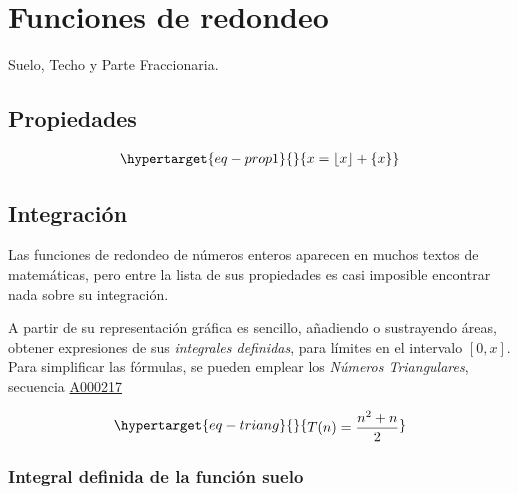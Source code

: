 \documentclass[
  letterpaper,
  DIV=11,
  numbers=noendperiod]{scrreprt}
\begin{document}
\[
\renewcommand{\floor}[1] {\lfloor #1 \rfloor}
\renewcommand{\ceil}[1] {\lceil #1 \rceil}
\renewcommand{\fracpart}[1] {\{ #1 \}}
\]

\hypertarget{funciones-de-redondeo}{%
\section{Funciones de redondeo}\label{funciones-de-redondeo}}

Suelo, Techo y Parte Fraccionaria.

\hypertarget{propiedades}{%
\subsection{Propiedades}\label{propiedades}}

\begin{equation}\protect\hypertarget{eq-prop1}{}{
\begin{align}
x =  \left\lfloor x \right\rfloor + \left\{ x \right\}
\end{align}
}\label{eq-prop1}\end{equation}

\hypertarget{integraciuxf3n}{%
\subsection{Integración}\label{integraciuxf3n}}

Las funciones de redondeo de números enteros aparecen en muchos textos
de matemáticas, pero entre la lista de sus propiedades es casi imposible
encontrar nada sobre su integración.

A partir de su representación gráfica es sencillo, añadiendo o
sustrayendo áreas, obtener expresiones de sus \emph{integrales
definidas}, para límites en el intervalo \([0, x]\). Para simplificar
las fórmulas, se pueden emplear los \emph{Números Triangulares},
secuencia \href{https://oeis.org/A000217}{A000217}

\begin{equation}\protect\hypertarget{eq-triang}{}{
\begin{multline}
T(n)=\frac{n^{2}+n}{2}
\end{multline}
}\label{eq-triang}\end{equation}

\hypertarget{integral-definida-de-la-funciuxf3n-suelo}{%
\subsubsection{Integral definida de la función
suelo}\label{integral-definida-de-la-funciuxf3n-suelo}}
\end{document}
